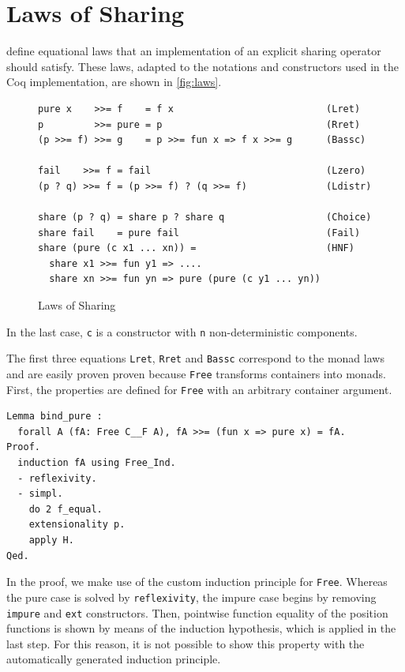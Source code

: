 \documentclass[a4paper, 11pt, fleqn, twoside]{scrreprt}
\newcommand{\cinl}[1]{\texttt{#1}}
\begin{document}
\section{Laws of Sharing}
\citet{fischer2009purely} define equational laws that an implementation of an explicit sharing operator should satisfy.
These laws, adapted to the notations and constructors used in the Coq implementation, are shown in \autoref{fig:laws}.

\begin{figure}[H]
\begin{verbatim}
pure x    >>= f    = f x                           (Lret)
p         >>= pure = p                             (Rret)
(p >>= f) >>= g    = p >>= fun x => f x >>= g      (Bassc)

fail    >>= f = fail                               (Lzero)
(p ? q) >>= f = (p >>= f) ? (q >>= f)              (Ldistr)

share (p ? q) = share p ? share q                  (Choice)
share fail    = pure fail                          (Fail)
share (pure (c x1 ... xn)) =                       (HNF)
  share x1 >>= fun y1 => ....
  share xn >>= fun yn => pure (pure (c y1 ... yn))
\end{verbatim}
\caption{Laws of Sharing}
\label{fig:laws}
\end{figure}

In the last case, \cinl{c} is a constructor with \cinl{n} non-deterministic components.

The first three equations \cinl{Lret}, \cinl{Rret} and \cinl{Bassc} correspond to the monad laws and are easily proven proven because \cinl{Free} transforms containers into monads.
First, the properties are defined for \cinl{Free} with an arbitrary container argument.

\begin{verbatim}
Lemma bind_pure :
  forall A (fA: Free C__F A), fA >>= (fun x => pure x) = fA.
Proof.
  induction fA using Free_Ind.
  - reflexivity.
  - simpl.
    do 2 f_equal.
    extensionality p.
    apply H.
Qed.
\end{verbatim}

In the proof, we make use of the custom induction principle for \cinl{Free}.
Whereas the pure case is solved by \cinl{reflexivity}, the impure case begins by removing \cinl{impure} and \cinl{ext} constructors.
Then, pointwise function equality of the position functions is shown by means of the induction hypothesis, which is applied in the last step.
For this reason, it is not possible to show this property with the automatically generated induction principle.
\end{document}
